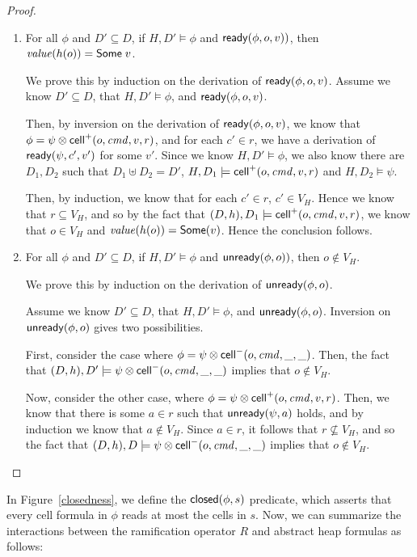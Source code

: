 \begin{proof}
\begin{enumerate}
\item For all $\phi$ and $D' \subseteq D$, if $H, D' \models \phi$ and $\mathsf{ready}({\phi}, {o}, {v}))$, then $\mathit{value}(h(o)) = \mathsf{Some}\;v$.

We prove this by induction on the derivation of
$\mathsf{ready}({\phi}, {o}, {v})$. Assume we know $D' \subseteq D$, that 
$H, D' \models \phi$, and $\mathsf{ready}({\phi}, {o}, {v})$. 

Then, by inversion on the derivation of $\mathsf{ready}({\phi}, {o}, {v})$, we know
that $\phi = \psi \otimes \mathsf{cell}^{+}({o}, {\mathit{cmd}}, {v}, {r})$, and for each $c'
\in r$, we have a derivation of $\mathsf{ready}({\psi}, {c'}, {v'})$ for some
$v'$. Since we know $H, D' \models \phi$, we also know there are $D_1,
D_2$ such that $D_1 \uplus D_2 = D'$, $H, D_1 \models
\mathsf{cell}^{+}({o}, {\mathit{cmd}}, {v}, {r})$ and $H, D_2 \models \psi$.

Then, by induction, we know that for each $c' \in r$, $c' \in V_H$. Hence
we know that $r \subseteq V_H$, and so by
the fact that $(D,h), D_1 \models \mathsf{cell}^{+}({o}, {\mathit{cmd}}, {v}, {r})$,
we know that $o \in V_H$ and $\mathit{value}(h(o)) =
\mathsf{Some}(v)$. Hence the conclusion follows.

\item For all $\phi$ and $D' \subseteq D$, if $H, D' \models \phi$ and $\mathsf{unready}({\phi}, {o}))$, then $o \not\in V_H$.

We prove this by induction on the derivation of $\mathsf{unready}({\phi}, {o})$.

Assume we know $D' \subseteq D$, that $H, D' \models \phi$, and
$\mathsf{unready}({\phi}, {o})$. Inversion on $\mathsf{unready}({\phi}, {o})$ gives two
possibilities.

First, consider the case where $\phi = \psi \otimes \mathsf{cell}^{-}({o}, {\mathit{cmd}}, {\_}, {\_})$. 
Then, the fact that $(D,h), D' \models \psi \otimes \mathsf{cell}^{-}({o}, {\mathit{cmd}}, {\_}, {\_})$
implies that $o \not\in V_H$. 

Now, consider the other case, where $\phi = \psi \otimes
\mathsf{cell}^{+}({o}, {\mathit{cmd}}, {v}, {r})$. Then, we know that there is some $a \in r$
such that $\mathsf{unready}({\psi}, {a})$ holds, and by induction we know that $a
\not\in V_H$. Since $a \in r$, it follows that $r \not\subseteq V_H$, and so the
fact that $(D,h), D \models \psi \otimes \mathsf{cell}^{-}({o}, {\mathit{cmd}}, {\_}, {\_})$ implies
that $o \not\in V_H$.
\end{enumerate}
\end{proof}


In Figure~\ref{closedness}, we define the $\mathsf{closed}({\phi}, {s})$ predicate,
which asserts that every cell formula in $\phi$ reads at most the
cells in $s$. Now, we can summarize the interactions between the 
ramification operator $R$ and abstract heap formulas as follows: 


